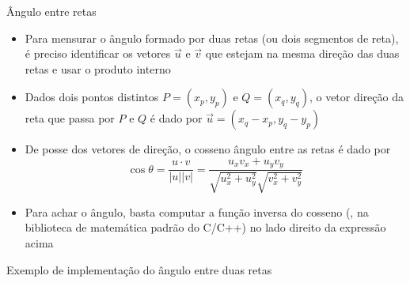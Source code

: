 \begin{frame}[fragile]{Ângulo entre retas}

    \begin{itemize}
        \item Para mensurar o ângulo formado por duas retas (ou dois segmentos de reta), é preciso 
            identificar os vetores $\vec{u}$ e $\vec{v}$ que estejam na mesma direção das duas retas e usar o produto interno

        \item Dados dois pontos distintos $P = (x_p, y_p)$ e $Q = (x_q, y_q)$, o vetor direção da 
            reta que passa por $P$ e $Q$ é dado por $\vec{u} = (x_q - x_p, y_q - y_p)$

        \item De posse dos vetores de direção, o cosseno ângulo entre as retas é dado por
        \[
            \cos \theta = \frac{u \cdot v}{|u||v|} = \frac{u_xv_x + u_yv_y}{\sqrt{u_x^2 + u_y^2}\sqrt{v_x^2 + v_y^2}}
        \]

        \item Para achar o ângulo, basta computar a função inversa do cosseno (, na 
            biblioteca de matemática padrão do C/C++) no lado direito da expressão acima
    \end{itemize}

\end{frame}

\begin{frame}[fragile]{Exemplo de implementação do ângulo entre duas retas}
\end{frame}


